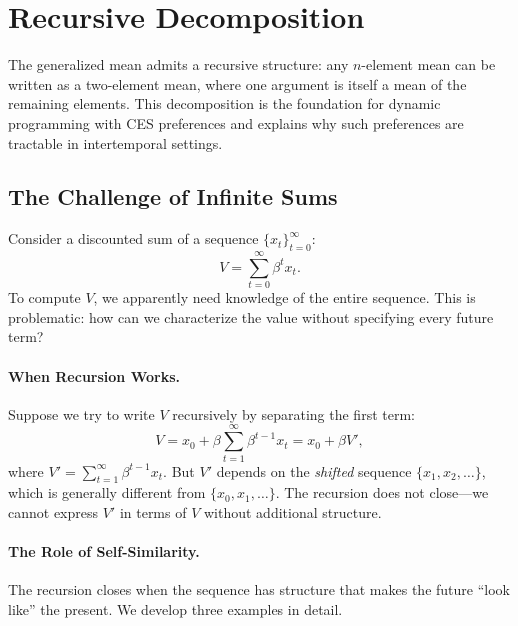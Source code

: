 \section{Recursive Decomposition}
\label{sec:recursive-decomposition}

The generalized mean admits a recursive structure: any $n$-element mean can be written as a two-element mean, where one argument is itself a mean of the remaining elements. This decomposition is the foundation for dynamic programming with CES preferences and explains why such preferences are tractable in intertemporal settings.

\subsection{The Challenge of Infinite Sums}
\label{subsec:challenge-infinite}

Consider a discounted sum of a sequence $\{x_t\}_{t=0}^{\infty}$:
\begin{equation}
V = \sum_{t=0}^{\infty} \beta^t x_t.
\label{eq:discounted-sum}
\end{equation}
To compute $V$, we apparently need knowledge of the entire sequence. This is problematic: how can we characterize the value without specifying every future term?

\paragraph{When Recursion Works.}
Suppose we try to write $V$ recursively by separating the first term:
\begin{equation}
V = x_0 + \beta \sum_{t=1}^{\infty} \beta^{t-1} x_t = x_0 + \beta V',
\label{eq:recursive-attempt}
\end{equation}
where $V' = \sum_{t=1}^{\infty} \beta^{t-1} x_t$. But $V'$ depends on the \emph{shifted} sequence $\{x_1, x_2, \ldots\}$, which is generally different from $\{x_0, x_1, \ldots\}$. The recursion does not close---we cannot express $V'$ in terms of $V$ without additional structure.

\paragraph{The Role of Self-Similarity.}
The recursion closes when the sequence has structure that makes the future ``look like'' the present. We develop three examples in detail.

